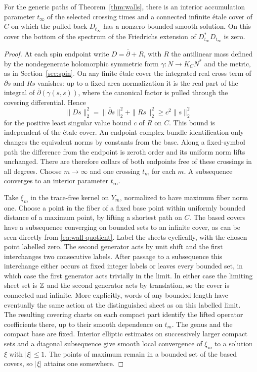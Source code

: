 \begin{proposition}\label{prop:wall-limit}
For the generic paths of Theorem~\ref{thm:walls}, there is an interior
accumulation parameter $t_\infty$ of the selected crossing times
and a connected infinite \'etale cover of $C$ on which the pulled-back
$D_{t_\infty}$ has a nonzero bounded smooth solution. On this cover
the bottom of the spectrum of the Friedrichs extension of
$D_{t_\infty}^*D_{t_\infty}$ is zero.
\end{proposition}

\begin{proof}
At each spin endpoint write $D=\bar\partial+R$, with $R$ the
antilinear mass defined by the nondegenerate holomorphic symmetric
form $\gamma:N\to K_C N^*$ and the metric, as in
Section~\ref{sec:spin}. On any finite \'etale cover the integrated
real cross term of $\bar\partial s$ and $Rs$ vanishes: up to a fixed
area normalization it is the real part of the integral of
$\bar\partial(\gamma(s,s))$, where the canonical factor is pulled
through the covering differential. Hence
\[
        \|Ds\|_2^2=\|\bar\partial s\|_2^2+\|Rs\|_2^2
                       \ge c^2\|s\|_2^2
\]
for the positive least singular value bound $c$ of $R$ on $C$.
This bound is independent of the \'etale cover. An endpoint complex
bundle identification only changes the equivalent norms by constants
from the base. Along a fixed-symbol path the difference from the
endpoint is zeroth order and its uniform norm lifts unchanged. There
are therefore collars of both endpoints free of these crossings in
all degrees. Choose $m\to\infty$ and one crossing $t_m$ for each
$m$. A subsequence converges to an interior parameter $t_\infty$.

Take $\xi_m$ in the trace-free kernel on $Y_m$, normalized to have
maximum fiber norm one. Choose a point in the fiber of a fixed base
point within uniformly bounded distance of a maximum point, by lifting
a shortest path on $C$. The based covers have a subsequence converging
on bounded sets to an infinite cover, as can be seen directly from
\eqref{eq:wall-quotient}. Label the sheets cyclically, with the
chosen point labelled zero. The second generator acts by unit shift
and the first interchanges two consecutive labels. After passage to
a subsequence this interchange either occurs at fixed integer labels
or leaves every bounded set, in which case the first generator acts
trivially in the limit. In either case the limiting sheet set is
$\mathbb Z$ and the second generator acts by translation, so the cover is
connected and infinite. More explicitly, words of any bounded length
have eventually the same action at the distinguished sheet as on this
labelled limit. The resulting covering charts on each compact part
identify the lifted operator coefficients there, up to their smooth
dependence on $t_m$. The genus and the compact base are fixed.
Interior elliptic estimates on successively larger compact sets and a
diagonal subsequence give smooth local convergence of $\xi_m$ to a
solution $\xi$ with $|\xi|\le1$. The points of maximum remain in a
bounded set of the based covers, so $|\xi|$ attains one somewhere.


\end{proof}
